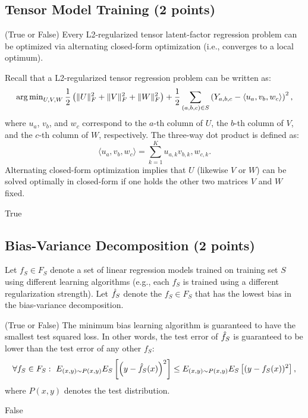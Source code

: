 \subsection{Tensor Model Training (2 points)}

\question (True or False) Every L2-regularized tensor latent-factor regression problem can be optimized via alternating closed-form optimization (i.e., converges to a local optimum).

Recall that a L2-regularized tensor regression problem can be written as:
$$\operatorname{arg\,min}_{U,V,W} \frac{1}{2}\left(\|U\|_F^2 + \|V\|_F^2 + \|W\|_F^2\right) + \frac{1}{2}\sum_{(a,b,c)\in S}\left(Y_{a,b,c} - \langle u_a,v_b,w_c\rangle\right)^2,$$
where  $u_a$, $v_b$, and $w_c$ correspond to the $a$-th column of $U$, the $b$-th column of $V$, and the $c$-th column of $W$, respectively.  The three-way dot product is defined as:
$$\langle u_a,v_b,w_c\rangle = \sum_{k=1}^K u_{a,k}v_{b,k}, w_{c,k}.$$
Alternating closed-form optimization implies that $U$ (likewise $V$ or $W$) can be solved optimally in closed-form if one holds the other two matrices $V$ and $W$ fixed.


\vspace{-0.1in}
\begin{solution}
True
\end{solution}

\smallskip

\subsection{Bias-Variance Decomposition (2 points)}

Let $f_S \in F_S$ denote a set of linear regression models  trained on training set $S$ using different learning algorithms (e.g., each $f_S$ is  trained using a different regularization strength).
Let $\hat{f}_S$ denote the $f_S \in F_S$ that has the lowest bias  in the bias-variance decomposition.

\question (True or False)  The minimum bias learning algorithm is guaranteed to have the smallest test squared loss.  In other words, the test error of $\hat{f}_S$ is guaranteed to be lower than the test error of any other $f_S$:
$$\forall f_S \in F_S:\ E_{(x,y)\sim P(x,y)} E_{S}\left[\left(y-\hat{f}_S(x)\right)^2\right] \leq E_{(x,y)\sim P(x,y)} E_{S}\left[(y-f_S(x))^2\right],$$
where $P(x,y)$ denotes the test distribution.

\begin{solution}
False
\end{solution}

